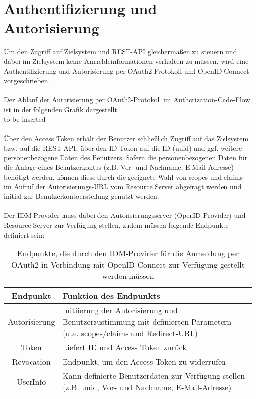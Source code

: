 \chapter{Authentifizierung und Autorisierung}
Um den Zugriff auf Zielsystem und REST-API gleichermaßen zu steuern und dabei im Zielsystem keine Anmeldeinformationen vorhalten zu müssen, wird eine Authentifizierung und Autorisierung per OAuth2-Protokoll und OpenID Connect vorgeschrieben.\\
\\
Der Ablauf der Autorisierung per OAuth2-Protokoll im Authorization-Code-Flow ist in der folgenden Grafik dargestellt. 
\\
to be inserted\\
\\
Über den Access Token erhält der Benutzer schließlich Zugriff auf das Zielsystem bzw. auf die REST-API, über den ID Token auf die ID (uuid) und ggf. weitere personenbezogene Daten des Benutzers. 
Sofern die personenbezogenen Daten für die Anlage eines Benutzerkontos (z.B. Vor- und Nachname, E-Mail-Adresse) benötigt werden, können diese durch die geeignete Wahl von scopes und claims im Aufruf der Autorisierungs-URL vom Resource Server abgefragt werden und initial zur Benutzerkontoerstellung genutzt werden.\\
\\
Der IDM-Provider muss dabei den Autorisierungsserver (OpenID Provider) und Resource Server zur Verfügung stellen, zudem müssen folgende Endpunkte definiert sein:\\

\begin{table}[htb]
    \begin{tabularx}{\textwidth}{|c|X|}
        \hline
\textbf{Endpunkt} & \textbf{Funktion des Endpunkts} \\ \hline
Autorisierung & Initiierung der Autorisierung und Benutzerzustimmung mit definierten Parametern (u.a. scopes/claims und Redirect-URL) \\ \hline
Token & Liefert ID und Access Token zurück \\ \hline
Revocation & Endpunkt, um den Access Token zu widerrufen \\ \hline
UserInfo & Kann definierte Benutzerdaten zur Verfügung stellen (z.B. uuid, Vor- und Nachname, E-Mail-Adresse) \\ \hline
    \end{tabularx}

        \caption{Endpunkte, die durch den IDM-Provider für die Anmeldung per OAuth2 in Verbindung mit OpenID Connect zur Verfügung gestellt werden müssen}
        \label{tab:auth:endpoints}
\end{table}

